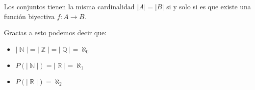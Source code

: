 \documentclass[12pt]{report}                                    %
\DeclareMathOperator \Naturals {\mathbb{N}}                     %
\DeclareMathOperator \Integers {\mathbb{Z}}                     %
\DeclareMathOperator \Racionals{\mathbb{Q}}                     %
\DeclareMathOperator \Reals {\mathbb{R}}                        %
\begin{document}
            Los conjuntos tienen la misma cardinalidad $|A| = |B|$ si y solo si es que existe
            una función biyectiva $f : A \to B$.


            Gracias a esto podemos decir que:

            \begin{itemize} 
                \item $|\Naturals| = |\Integers| = |\Racionals| = \aleph_0$

                \item $P(|\Naturals|) = |\Reals| = \aleph_1$

                \item $P(|\Reals|) = \aleph_2$

            \end{itemize} 
\end{document}
